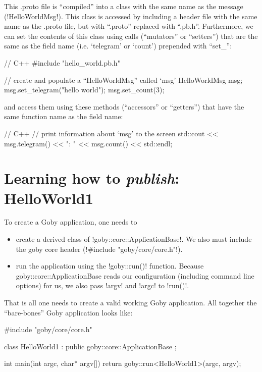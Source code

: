 This .proto file is ``compiled'' into a class with the same name as the message (!HelloWorldMsg!). This class is accessed by including a header file with the same name as the .proto file, but with ``.proto'' replaced with ``.pb.h''. Furthermore, we can set the contents of this class using calls (``mutators'' or ``setters'') that are the same as the field name (i.e. `telegram' or `count') prepended with ``set\_'':
\begin{boxedverbatim}
// C++ 
#include "hello_world.pb.h"

// create and populate a ``HelloWorldMsg'' called `msg'
HelloWorldMsg msg;
msg.set_telegram("hello world");
msg.set_count(3);
\end{boxedverbatim}
\resetbvlinenumber

and access them using these methods (``accessors'' or ``getters'') that have the same function name as the field name:

\begin{boxedverbatim}
// C++ 
// print information about `msg' to the screen
std::cout << msg.telegram() << ": " << msg.count() << std::endl;
\end{boxedverbatim}
\resetbvlinenumber


\section{Learning how to \textit{publish}: HelloWorld1}

To create a Goby application, one needs to

\begin{itemize}
\item create a derived class of !goby::core::ApplicationBase!. We also must include the goby core header (!#include "goby/core/core.h"!).
\item run the application using the !goby::run()! function. Because goby::core::ApplicationBase reads our configuration (including command line options) for us, we also pass !argv! and !argc! to !run()!.
\end{itemize}

That is all one needs to create a valid working Goby application. All together the ``bare-bones'' Goby application looks like:

\begin{boxedverbatim}
#include "goby/core/core.h"

class HelloWorld1 : public goby::core::ApplicationBase {};

int main(int argc, char* argv[])
{   
    return goby::run<HelloWorld1>(argc, argv);
}
\end{boxedverbatim}
\resetbvlinenumber

